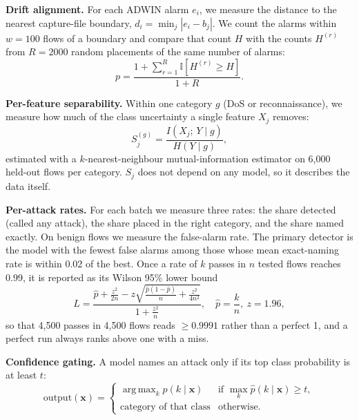 \documentclass[preprint,12pt]{elsarticle}
\DeclareMathOperator*{\argmax}{arg\,max}
\begin{document}
\textbf{Drift alignment.} For each ADWIN alarm $e_i$, we measure the distance to the nearest capture-file boundary, $d_i = \min_j |e_i - b_j|$. We count the alarms within $w = 100$ flows of a boundary and compare that count $H$ with the counts $H^{(r)}$ from $R = 2000$ random placements of the same number of alarms:
\begin{equation}
p = \frac{1 + \sum_{r=1}^{R}\mathbb{I}\left[H^{(r)} \ge H\right]}{1 + R}.
\label{eq:pvalue}
\end{equation}

\textbf{Per-feature separability.} Within one category $g$ (DoS or reconnaissance), we measure how much of the class uncertainty a single feature $X_j$ removes:
\begin{equation}
S_j^{(g)} = \frac{I\left(X_j;\,Y \mid g\right)}{H\left(Y \mid g\right)},
\label{eq:sep}
\end{equation}
estimated with a $k$-nearest-neighbour mutual-information estimator \cite{b17} on 6,000 held-out flows per category. $S_j$ does not depend on any model, so it describes the data itself.

\textbf{Per-attack rates.} For each batch we measure three rates: the share detected (called any attack), the share placed in the right category, and the share named exactly. On benign flows we measure the false-alarm rate. The primary detector is the model with the fewest false alarms among those whose mean exact-naming rate is within 0.02 of the best. Once a rate of $k$ passes in $n$ tested flows reaches 0.99, it is reported as its Wilson 95\% lower bound
\begin{equation}
L = \frac{\hat p + \frac{z^2}{2n} - z\sqrt{\frac{\hat p(1-\hat p)}{n} + \frac{z^2}{4n^2}}}{1 + \frac{z^2}{n}}, \quad \hat p = \frac{k}{n},\ z = 1.96,
\label{eq:wilson}
\end{equation}
so that 4,500 passes in 4,500 flows reads $\ge 0.9991$ rather than a perfect 1, and a perfect run always ranks above one with a miss.

\textbf{Confidence gating.} A model names an attack only if its top class probability is at least $t$:
\begin{equation}
\text{output}(\mathbf{x}) =
\begin{cases}
\argmax_k \hat{p}(k\mid\mathbf{x}) & \text{if } \max_k \hat{p}(k\mid\mathbf{x}) \ge t,\\
\text{category of that class} & \text{otherwise.}
\end{cases}
\label{eq:gate}
\end{equation}
\end{document}

